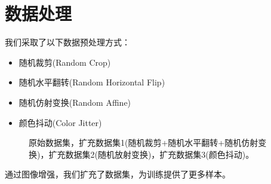 \documentclass[hyperref, UTF8, 12pt]{article}
\theoremstyle{definition}
\begin{document}
\section{数据处理}
我们采取了以下数据预处理方式：
\begin{itemize}
\item 随机裁剪(Random Crop)
\item 随机水平翻转(Random Horizontal Flip)
\item 随机仿射变换(Random Affine)
\item 颜色抖动(Color Jitter)
\end{itemize}

\begin{figure}[H]
	\centering
	\caption{原始数据集，扩充数据集1(随机裁剪+随机水平翻转+随机仿射变换)，扩充数据集2(随机放射变换)，扩充数据集3(颜色抖动)。}
\end{figure}
通过图像增强，我们扩充了数据集，为训练提供了更多样本。
\end{document}
